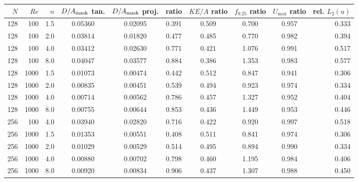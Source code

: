 \begin{tabular}{@{}rrrccccccr@{}}
\toprule
$N$ & $Re$ & $n$ & $D/A_{\rm mask}$ tan. & $D/A_{\rm mask}$ proj. & ratio &
$KE/A$ ratio & $f_{0.25}$ ratio & $U_{\max}$ ratio & rel. $L_2(u)$ \\
\midrule
128 & 100 & 1.5 & 0.05360 & 0.02095 & 0.391 & 0.509 & 0.700 & 0.957 & 0.333 \\
128 & 100 & 2.0 & 0.03814 & 0.01820 & 0.477 & 0.485 & 0.770 & 0.982 & 0.394 \\
128 & 100 & 4.0 & 0.03412 & 0.02630 & 0.771 & 0.421 & 1.076 & 0.991 & 0.517 \\
128 & 100 & 8.0 & 0.04047 & 0.03577 & 0.884 & 0.386 & 1.353 & 0.983 & 0.577 \\
128 & 1000 & 1.5 & 0.01073 & 0.00474 & 0.442 & 0.512 & 0.847 & 0.941 & 0.306 \\
128 & 1000 & 2.0 & 0.00835 & 0.00451 & 0.539 & 0.494 & 0.923 & 0.974 & 0.334 \\
128 & 1000 & 4.0 & 0.00714 & 0.00562 & 0.786 & 0.457 & 1.327 & 0.952 & 0.404 \\
128 & 1000 & 8.0 & 0.00755 & 0.00644 & 0.853 & 0.436 & 1.449 & 0.953 & 0.446 \\
256 & 100 & 4.0 & 0.03940 & 0.02820 & 0.716 & 0.422 & 0.920 & 0.997 & 0.518 \\
256 & 1000 & 1.5 & 0.01353 & 0.00551 & 0.408 & 0.511 & 0.841 & 0.974 & 0.306 \\
256 & 1000 & 2.0 & 0.01029 & 0.00529 & 0.514 & 0.495 & 0.894 & 0.990 & 0.334 \\
256 & 1000 & 4.0 & 0.00880 & 0.00702 & 0.798 & 0.460 & 1.195 & 0.984 & 0.406 \\
256 & 1000 & 8.0 & 0.00920 & 0.00834 & 0.906 & 0.437 & 1.307 & 0.988 & 0.450 \\
\bottomrule
\end{tabular}
